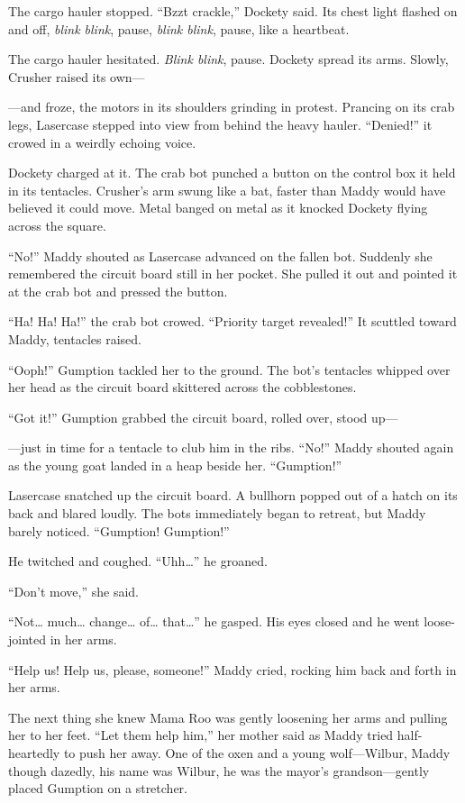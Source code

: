 \documentclass[10pt]{article}
\begin{document}
The cargo hauler stopped. ``Bzzt crackle,'' Dockety said. Its chest
light flashed on and off, \emph{blink blink}, pause, \emph{blink blink},
pause, like a heartbeat.

The cargo hauler hesitated. \emph{Blink blink}, pause. Dockety spread
its arms. Slowly, Crusher raised its own---

---and froze, the motors in its shoulders grinding in protest. Prancing
on its crab legs, Lasercase stepped into view from behind the heavy
hauler. ``Denied!'' it crowed in a weirdly echoing voice.

Dockety charged at it. The crab bot punched a button on the control box
it held in its tentacles. Crusher's arm swung like a bat, faster than
Maddy would have believed it could move. Metal banged on metal as it
knocked Dockety flying across the square.

``No!'' Maddy shouted as Lasercase advanced on the fallen bot. Suddenly
she remembered the circuit board still in her pocket. She pulled it out
and pointed it at the crab bot and pressed the button.

``Ha! Ha! Ha!'' the crab bot crowed. ``Priority target revealed!'' It
scuttled toward Maddy, tentacles raised.

``Ooph!'' Gumption tackled her to the ground. The bot's tentacles
whipped over her head as the circuit board skittered across the
cobblestones.

``Got it!'' Gumption grabbed the circuit board, rolled over, stood up---

---just in time for a tentacle to club him in the ribs. ``No!'' Maddy
shouted again as the young goat landed in a heap beside her.
``Gumption!''

Lasercase snatched up the circuit board. A bullhorn popped out of a
hatch on its back and blared loudly. The bots immediately began to
retreat, but Maddy barely noticed. ``Gumption! Gumption!''

He twitched and coughed. ``Uhh\ldots{}'' he groaned.

``Don't move,'' she said.

``Not\ldots{} much\ldots{} change\ldots{} of\ldots{} that\ldots{}'' he
gasped. His eyes closed and he went loose-jointed in her arms.

``Help us! Help us, please, someone!'' Maddy cried, rocking him back and
forth in her arms.

The next thing she knew Mama Roo was gently loosening her arms and
pulling her to her feet. ``Let them help him,'' her mother said as Maddy
tried half-heartedly to push her away. One of the oxen and a young
wolf---Wilbur, Maddy though dazedly, his name was Wilbur, he was the
mayor's grandson---gently placed Gumption on a stretcher.
\end{document}
